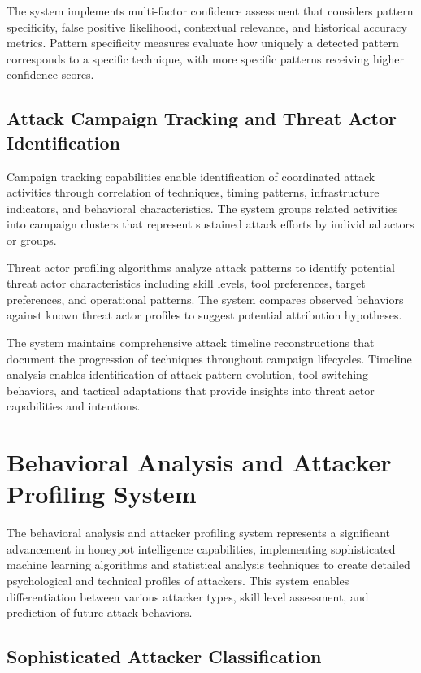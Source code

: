 The system implements multi-factor confidence assessment that considers pattern specificity, false positive likelihood, contextual relevance, and historical accuracy metrics. Pattern specificity measures evaluate how uniquely a detected pattern corresponds to a specific technique, with more specific patterns receiving higher confidence scores.

\subsection{Attack Campaign Tracking and Threat Actor Identification}

Campaign tracking capabilities enable identification of coordinated attack activities through correlation of techniques, timing patterns, infrastructure indicators, and behavioral characteristics. The system groups related activities into campaign clusters that represent sustained attack efforts by individual actors or groups.

Threat actor profiling algorithms analyze attack patterns to identify potential threat actor characteristics including skill levels, tool preferences, target preferences, and operational patterns. The system compares observed behaviors against known threat actor profiles to suggest potential attribution hypotheses.

The system maintains comprehensive attack timeline reconstructions that document the progression of techniques throughout campaign lifecycles. Timeline analysis enables identification of attack pattern evolution, tool switching behaviors, and tactical adaptations that provide insights into threat actor capabilities and intentions.

\section{Behavioral Analysis and Attacker Profiling System}

The behavioral analysis and attacker profiling system represents a significant advancement in honeypot intelligence capabilities, implementing sophisticated machine learning algorithms and statistical analysis techniques to create detailed psychological and technical profiles of attackers. This system enables differentiation between various attacker types, skill level assessment, and prediction of future attack behaviors.

\subsection{Sophisticated Attacker Classification}

